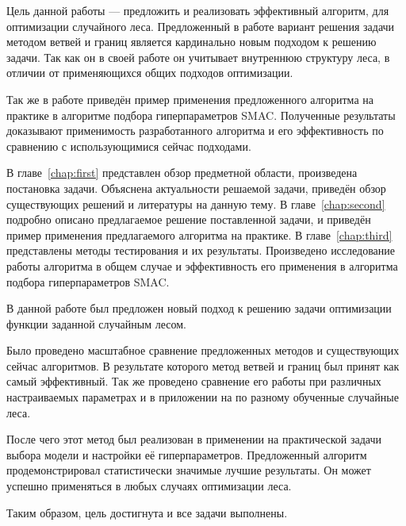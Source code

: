 \documentclass[pscyr]{itmo-student-thesis}
\begin{document}
Цель данной работы --- предложить и реализовать эффективный алгоритм, для
оптимизации случайного леса. Предложенный в работе вариант решения задачи
методом ветвей и границ является кардинально новым подходом к решению задачи.
Так как он в своей работе он учитывает внутреннюю структуру леса, в отличии от
применяющихся общих подходов оптимизации.

Так же в работе приведён пример применения предложенного алгоритма на практике
в алгоритме подбора гиперпараметров SMAC\@. Полученные результаты доказывают
применимость разработанного алгоритма и его эффективность по сравнению
с использующимися сейчас подходами.

В главе~\ref{chap:first} представлен обзор предметной области, произведена
постановка задачи. Объяснена актуальности решаемой задачи, приведён обзор
существующих решений и литературы на данную тему. В главе~\ref{chap:second}
подробно описано предлагаемое решение поставленной задачи, и приведён пример
применения предлагаемого алгоритма на практике. В главе~\ref{chap:third}
представлены методы тестирования и их результаты. Произведено исследование
работы алгоритма в общем случае и эффективность его применения в алгоритма
подбора гиперпараметров SMAC\@.






\startconclusionpage{}
В данной работе был предложен новый подход к решению задачи оптимизации функции
заданной случайным лесом.

Было проведено масштабное сравнение предложенных методов и существующих сейчас
алгоритмов. В результате которого метод ветвей и границ был принят как самый
эффективный. Так же проведено сравнение его работы при различных настраиваемых
параметрах и в приложении на по разному обученные случайные леса.

После чего этот метод был реализован в применении на практической задачи выбора
модели и настройки её гиперпараметров. Предложенный алгоритм продемонстрировал
статистически значимые лучшие результаты. Он может успешно применяться в любых
случаях оптимизации леса.

Таким образом, цель достигнута и все задачи выполнены.

\printmainbibliography%
\end{document}
